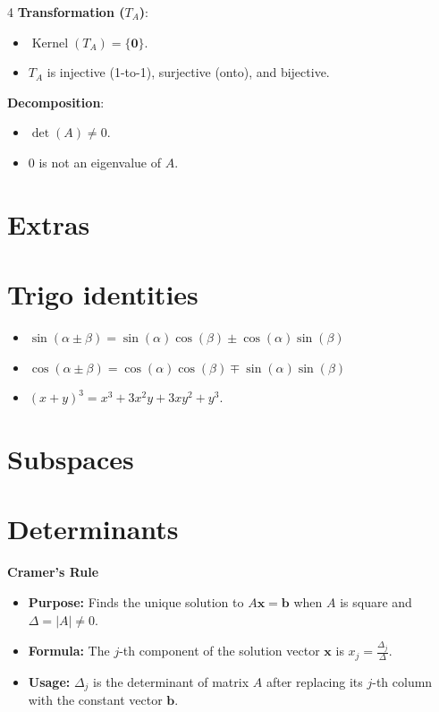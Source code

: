 \documentclass[9pt]{extarticle}
\begin{document}
\begin{multicols*}{4}
\textbf{Transformation ($T_A$)}:
\begin{itemize}[leftmargin=*, nosep]
    \item $\operatorname{Kernel}(T_A) = \{\mathbf{0}\}$.
    \item $T_A$ is injective (1-to-1), surjective (onto), and bijective.
\end{itemize}
\textbf{Decomposition}:
\begin{itemize}[leftmargin=*, nosep]
    \item $\det(A) \ne 0$.
    \item $0$ is not an eigenvalue of $A$.
\end{itemize}

\newpage

\section*{Extras}
\section*{Trigo identities}
\begin{itemize}
    \item $\sin(\alpha\pm\beta)=\sin(\alpha)\cos(\beta)\pm \cos(\alpha)\sin(\beta)$
    \item $\cos(\alpha\pm\beta)=\cos(\alpha)\cos(\beta)\mp \sin(\alpha)\sin(\beta)$
    \item $(x+y)^3 = x^3 + 3x^2y + 3xy^2 + y^3$.
\end{itemize}

\section*{Subspaces}

\section*{Determinants}
\textbf{Cramer's Rule}
\begin{itemize}
    \item \textbf{Purpose:} Finds the unique solution to $A\mathbf{x}=\mathbf{b}$ when $A$ is square and $\Delta = |A| \ne 0$.
    \item \textbf{Formula:} The $j$-th component of the solution vector $\mathbf{x}$ is $x_j = \frac{\Delta_j}{\Delta}$.
    \item \textbf{Usage:} $\Delta_j$ is the determinant of matrix $A$ after replacing its $j$-th column with the constant vector $\mathbf{b}$.
\end{itemize}


\end{multicols*}
\end{document}
